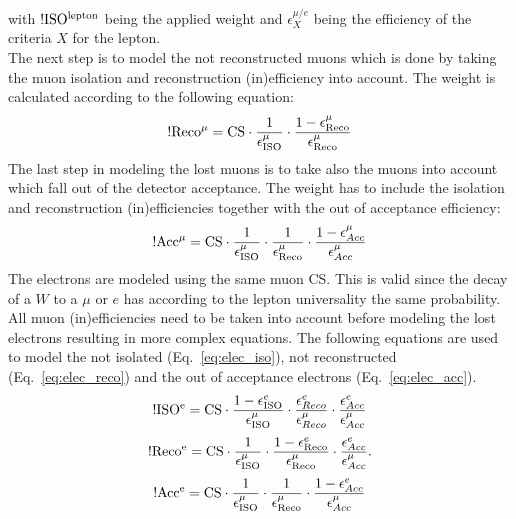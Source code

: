with $\rm !ISO^{lepton}$ being the applied weight and $\epsilon_{X}^{\mu/e}$ being the efficiency of the criteria $X$ for the lepton.\\
The next step is to model the not reconstructed muons which is done by taking the muon isolation and reconstruction (in)efficiency into account. The weight is calculated according to the following equation:
\begin{equation}
 {\rm !Reco^{\mu}} = {\rm CS}\cdot \frac{1}{\epsilon_{\rm ISO}^{\mu}} \cdot \frac{1-\epsilon_{\rm Reco}^{\mu}}{\epsilon_{\rm Reco}^{\mu}}
\label{eq:reconstruction_muon}
\end{equation}
The last step in modeling the lost muons is to take also the muons into account which fall out of the detector acceptance. The weight has to include the isolation and reconstruction (in)efficiencies together with the out of acceptance efficiency:
\begin{equation}
 {\rm !Acc^{\mu}} = {\rm CS}\cdot \frac{1}{\epsilon_{\rm ISO}^{\mu}}\cdot \frac{1}{\epsilon_{\rm Reco}^{\mu}} \cdot \frac{1-\epsilon^{\mu}_{Acc}}{\epsilon^{\mu}_{Acc}}
\label{eq:acceptance_muon}
\end{equation}
The electrons are modeled using the same muon CS. This is valid since the decay of a $W$ to a $\mu$ or $e$ has according to the lepton universality the same probability\cite{bib:berger}.
All muon (in)efficiencies need to be taken into account before modeling the lost electrons resulting in more complex equations. The following equations are used to model the not isolated (Eq.~\ref{eq:elec_iso}), not reconstructed (Eq.~\ref{eq:elec_reco}) and the out of acceptance electrons (Eq.~\ref{eq:elec_acc}). 
\begin{equation}
{\rm !ISO^{e}} = {\rm CS}\cdot \frac{1-\epsilon_{\rm ISO}^{e}}{\epsilon_{\rm ISO}^{\mu}} \cdot \frac{\epsilon^{e}_{Reco}}{\epsilon^{\mu}_{Reco}} \cdot \frac{\epsilon^{e}_{Acc}}{\epsilon^{\mu}_{Acc}}
\label{eq:elec_iso}
\end{equation}
\begin{equation}
{\rm !Reco^{e}} = {\rm CS}\cdot \frac{1}{\epsilon_{\rm ISO}^{\mu}}\cdot \frac{1-\epsilon_{\rm Reco}^{e}}{\epsilon_{\rm Reco}^{\mu}}  \cdot \frac{\epsilon^{e}_{Acc}}{\epsilon^{\mu}_{Acc}}.
 \label{eq:elec_reco}
\end{equation}
\begin{equation}
{\rm !Acc^{e}} = {\rm CS}\cdot \frac{1}{\epsilon_{\rm ISO}^{\mu}}\cdot \frac{1}{\epsilon_{\rm Reco}^{\mu}}  \cdot \frac{1 - \epsilon^{e}_{Acc}}{\epsilon^{\mu}_{Acc}}
 \label{eq:elec_acc}
\end{equation}

